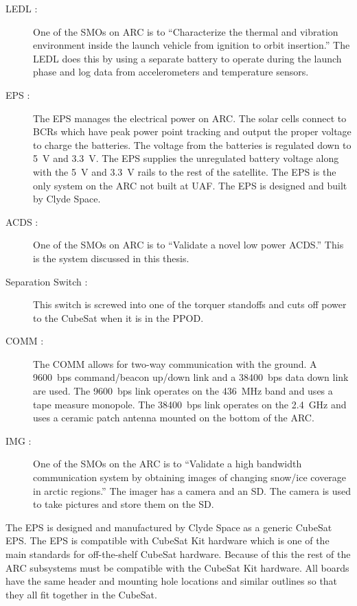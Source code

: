 \begin{description}
    \item[\acs{LEDL} :] One of the \acp{SMO} on \ac{ARC} is to \enquote{Characterize the thermal and vibration environment inside the launch vehicle from ignition to orbit insertion.}\cite{ARCweb} The \ac{LEDL} does this by using a separate battery to operate during the launch phase and log data from accelerometers and temperature sensors.
    \item[\acs{EPS} :] The \ac{EPS} manages the electrical power on \ac{ARC}. The solar cells connect to \acp{BCR} which have peak power point tracking and output the proper voltage to charge the batteries. The voltage from the batteries is regulated down to 5~V and 3.3~V. The \ac{EPS} supplies the unregulated battery voltage along with the 5~V and 3.3~V rails to the rest of the satellite. The \ac{EPS} is the only system on the \ac{ARC} not built at UAF. The \ac{EPS} is designed and built by Clyde Space. \cite{ClydeEPS}
    \item[\acs{ACDS} :] One of the \acp{SMO} on \ac{ARC} is to \enquote{Validate a novel low power \acf{ACDS}.} \cite{ARCweb} This is the system discussed in this thesis.
    \item[Separation Switch :] This switch is screwed into one of the torquer standoffs and cuts off power to the CubeSat when it is in the \ac{PPOD}.
    \item[\acs{COMM} :] The \ac{COMM} allows for two-way communication with the ground. A 9600~bps command/beacon up/down link and a 38400~bps data down link are used. The 9600~bps link operates on the 436~MHz band and uses a tape measure monopole. The 38400~bps link operates on the 2.4~GHz and uses a ceramic patch antenna mounted on the bottom of the \ac{ARC}.
    \item[\acs{IMG} :] One of the \acp{SMO} on the \ac{ARC} is to \enquote{Validate a high bandwidth communication system by obtaining images of changing snow/ice coverage in arctic regions.}\cite{ARCweb} The imager has a camera and an \ac{SD}. The camera is used to take pictures and store them on the \ac{SD}.
\end{description}

The \ac{EPS} is designed and manufactured by Clyde Space as a generic CubeSat \ac{EPS}. The \ac{EPS} is compatible with CubeSat Kit\cite{CSK} hardware which is one of the main standards for off-the-shelf CubeSat hardware. Because of this the rest of the \ac{ARC} subsystems must be compatible with the CubeSat Kit hardware. All boards have the same header and mounting hole locations and similar outlines so that they all fit together in the CubeSat.

